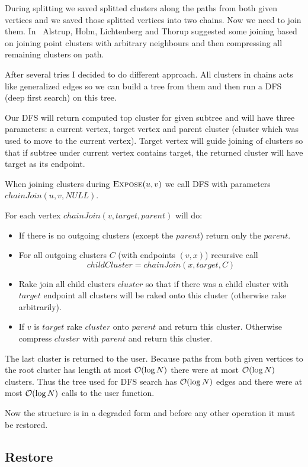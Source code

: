 During splitting we saved splitted clusters along the paths from both given
vertices and we saved those splitted vertices into two chains. Now we need to
join them. In~\cite{TopTrees} Alstrup, Holm, Lichtenberg and Thorup suggested
some joining based on joining point clusters with arbitrary neighbours and then
compressing all remaining clusters on path.

After several tries I decided to do different approach. All clusters in chains
acts like generalized edges so we can build a tree from them and then run
a DFS (deep first search) on this tree.

Our DFS will return computed top cluster for given subtree and will have three
parameters: a current vertex, target vertex and parent cluster (cluster which
was used to move to the current vertex). Target vertex will guide joining of
clusters so that if subtree under current vertex contains target, the returned
cluster will have target as its endpoint.

When joining clusters during $\hbox{\sc Expose}(u,v)$ we call DFS with parameters
$chainJoin(u,v,NULL)$.

For each vertex $chainJoin(v,target,parent)$ will do:
\begin{itemize}
\item If there is no outgoing clusters (except the $parent$) return only the
$parent$.
\item For all outgoing clusters $C$ (with endpoints $(v,x)$) recursive call
$$childCluster = chainJoin(x,target,C)$$
\item Rake join all child clusters $cluster$ so that if there was a child
cluster with $target$ endpoint all clusters will be raked onto this cluster
(otherwise rake arbitrarily).
\item If $v$ is $target$ rake $cluster$ onto $parent$ and return this cluster.
Otherwise compress $cluster$ with $parent$ and return this cluster.
\end{itemize}


The last cluster is returned to the user. Because paths from both given vertices
to the root cluster has length at most ${\cal O}(\log N)$ there were at most ${\cal O}(\log
N)$ clusters. Thus the tree used for DFS search has ${\cal O}(\log N)$ edges and there
were at most ${\cal O}(\log N)$ calls to the \Join{} user function.

Now the structure is in a degraded form and before any other operation it must
be restored.

\subsection{Restore}

